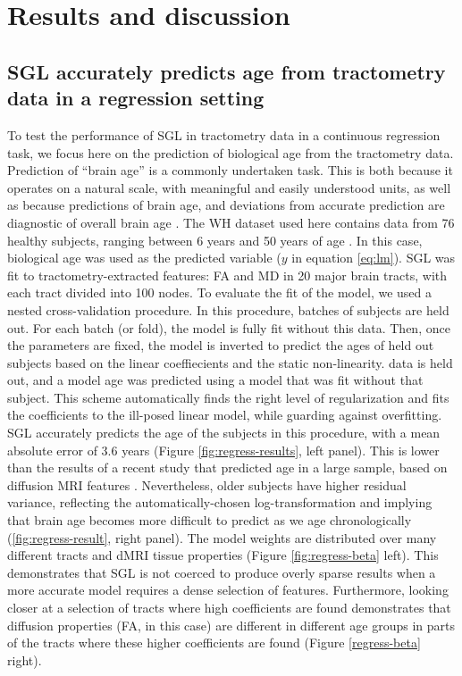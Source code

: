 \section*{Results and discussion}

\subsection*{SGL accurately predicts age from tractometry data in a regression setting}

To test the performance of SGL in tractometry data in a continuous regression
task, we focus here on the prediction of biological age from the tractometry
data. Prediction of ``brain age'' is a commonly undertaken task. This is both
because it operates on a natural scale, with meaningful and easily understood
units, as well as because predictions of brain age, and deviations from accurate
prediction are diagnostic of overall brain age . The WH
dataset used here contains data from 76 healthy subjects, ranging between 6
years and 50 years of age \cite{yeatman2014lifespan}. In this case, biological
age was used as the predicted variable ($y$ in equation \ref{eq:lm}). SGL was
fit to tractometry-extracted features: FA and MD in 20 major brain tracts, with
each tract divided into 100 nodes. To evaluate the fit of the model, we used a
nested cross-validation procedure. In this procedure, batches of subjects are
held out. For each batch (or fold), the model is fully fit without this data.
Then, once the parameters are fixed, the model is inverted to predict the ages
of held out subjects based on the linear coeffiecients and the static
non-linearity. data is held out, and a model age was predicted using a model
that was fit without that subject. This scheme automatically finds the right
level of regularization and fits the coefficients to the ill-posed linear model,
while guarding against overfitting. SGL accurately predicts the age of the
subjects in this procedure, with a mean absolute error of 3.6 years (Figure
\ref{fig:regress-results}, left panel). This is lower than the results of a
recent study that predicted age in a large sample, based on diffusion MRI
features \cite{Richard2018-ux}. Nevertheless, older subjects have higher
residual variance, reflecting the automatically-chosen log-transformation and
implying that brain age becomes more difficult to predict as we age
chronologically (\ref{fig:regress-result}, right panel). The model weights are
distributed over many different tracts and dMRI tissue properties (Figure
\ref{fig:regress-beta} left). This demonstrates that SGL is not coerced to
produce overly sparse results when a more accurate model requires a dense
selection of features. Furthermore, looking closer at a selection of tracts
where high coefficients are found demonstrates that diffusion properties (FA, in
this case) are different in different age groups in parts of the tracts where
these higher coefficients are found (Figure \ref{regress-beta} right).


